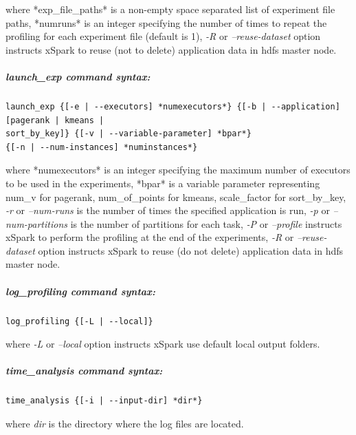 where *exp\_file\_paths* is a non-empty space separated list of
experiment file paths, *numruns* is an integer specifying the number of
times to repeat the profiling for each experiment file (default is 1),
\emph{-R} or \emph{--reuse-dataset} option instructs xSpark to reuse
(not to delete) application data in hdfs master node.

\hypertarget{launch_exp-command-syntax}{%
\subparagraph{\texorpdfstring{\emph{launch\_exp} command
		syntax:}{launch\_exp command syntax:}}\label{launch_exp-command-syntax}}

\begin{verbatim}
launch_exp {[-e | --executors] *numexecutors*} {[-b | --application] [pagerank | kmeans | 
sort_by_key]} {[-v | --variable-parameter] *bpar*} 
{[-n | --num-instances] *numinstances*} 
\end{verbatim}

where *numexecutors* is an integer specifying the maximum number of
executors to be used in the experiments, *bpar* is a variable parameter
representing num\_v for pagerank, num\_of\_points for kmeans,
scale\_factor for sort\_by\_key, \emph{-r} or \emph{--num-runs} is the
number of times the specified application is run, \emph{-p} or
\emph{--num-partitions} is the number of partitions for each task,
\emph{-P} or \emph{--profile} instructs xSpark to perform the profiling
at the end of the experiments, \emph{-R} or \emph{--reuse-dataset}
option instructs xSpark to reuse (do not delete) application data in
hdfs master node.

\hypertarget{log_profiling-command-syntax}{%
\subparagraph{\texorpdfstring{\emph{log\_profiling} command
		syntax:}{log\_profiling command syntax:}}\label{log_profiling-command-syntax}}

\begin{verbatim}
log_profiling {[-L | --local]}
\end{verbatim}

where \emph{-L} or \emph{--local} option instructs xSpark use default
local output folders.

\hypertarget{time_analysis-command-syntax}{%
\subparagraph{\texorpdfstring{\emph{time\_analysis} command
		syntax:}{time\_analysis command syntax:}}\label{time_analysis-command-syntax}}

\begin{verbatim}
time_analysis {[-i | --input-dir] *dir*}
\end{verbatim}

where \emph{dir} is the directory where the log files are located.

